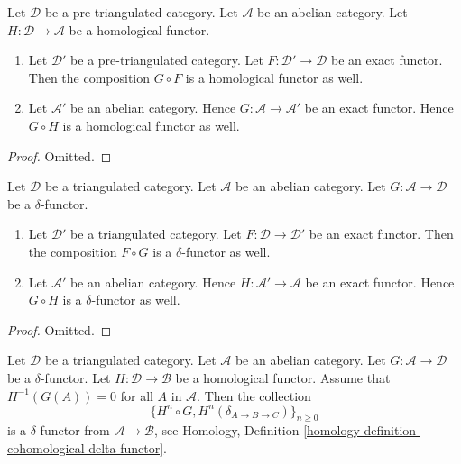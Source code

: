 \begin{lemma}
\label{lemma-exact-compose-homological-functor}
Let $\mathcal{D}$ be a pre-triangulated category.
Let $\mathcal{A}$ be an abelian category.
Let $H : \mathcal{D} \to \mathcal{A}$ be a homological functor.
\begin{enumerate}
\item Let $\mathcal{D}'$ be a pre-triangulated category.
Let $F : \mathcal{D}' \to \mathcal{D}$ be an exact functor.
Then the composition $G \circ F$ is a homological functor as well.
\item Let $\mathcal{A}'$ be an abelian category. Hence
$G : \mathcal{A} \to \mathcal{A}'$ be an exact functor.
Hence $G \circ H$ is a homological functor as well.
\end{enumerate}
\end{lemma}

\begin{proof}
Omitted.
\end{proof}

\begin{lemma}
\label{lemma-exact-compose-delta-functor}
Let $\mathcal{D}$ be a triangulated category.
Let $\mathcal{A}$ be an abelian category.
Let $G : \mathcal{A} \to \mathcal{D}$ be a $\delta$-functor.
\begin{enumerate}
\item Let $\mathcal{D}'$ be a triangulated category.
Let $F : \mathcal{D} \to \mathcal{D}'$ be an exact functor.
Then the composition $F \circ G$ is a $\delta$-functor as well.
\item Let $\mathcal{A}'$ be an abelian category. Hence
$H : \mathcal{A}' \to \mathcal{A}$ be an exact functor.
Hence $G \circ H$ is a $\delta$-functor as well.
\end{enumerate}
\end{lemma}

\begin{proof}
Omitted.
\end{proof}

\begin{lemma}
\label{lemma-compose-delta-functor-homological}
Let $\mathcal{D}$ be a triangulated category.
Let $\mathcal{A}$ be an abelian category.
Let $G : \mathcal{A} \to \mathcal{D}$ be a $\delta$-functor.
Let $H : \mathcal{D} \to \mathcal{B}$ be a homological functor.
Assume that $H^{-1}(G(A)) = 0$ for all $A$ in $\mathcal{A}$.
Then the collection
$$
\{H^n \circ G, H^n(\delta_{A \to B \to C})\}_{n \geq 0}
$$
is a $\delta$-functor from $\mathcal{A} \to \mathcal{B}$, see
Homology, Definition \ref{homology-definition-cohomological-delta-functor}.
\end{lemma}

